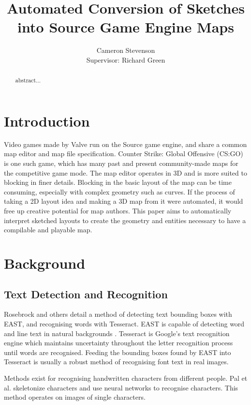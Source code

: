 \documentclass{IEEEtran}
\begin{document}
\title{Automated Conversion of Sketches into Source Game Engine Maps}
\author{Cameron Stevenson\\[0.5cm]{\small Supervisor: Richard Green}}
 
 \maketitle
 
\begin{abstract}
abstract...
\end{abstract}

\section{Introduction}

Video games made by Valve run on the Source game engine, and share a common map editor and map file specification. Counter Strike: Global Offensive (CS:GO) is one such game, which has many past and present community-made maps for the competitive game mode. The map editor operates in 3D and is more suited to blocking in finer details. Blocking in the basic layout of the map can be time consuming, especially with complex geometry such as curves. If the process of taking a 2D layout idea and making a 3D map from it were automated, it would free up creative potential for map authors. This paper aims to automatically interpret sketched layouts to create the geometry and entities necessary to have a compilable and playable map.

\section{Background}
\subsection{Text Detection and Recognition}
Rosebrock \cite{rosebrock2018opencv} and others detail a method of detecting text bounding boxes with EAST, and recognising words with Tesseract. EAST is capable of detecting word and line text in natural backgrounds \cite{zhou2017east}. Tesseract \cite{smith2007overview} is Google's text recognition engine which maintains uncertainty throughout the letter recognition process until words are recognised. Feeding the bounding boxes found by EAST into Tesseract is usually a robust method of recognising font text in real images.

Methods exist for recognising handwritten characters from different people. Pal et al. \cite{pal2010handwritten} skeletonize characters and use neural networks to recognise characters. This method operates on images of single characters.
\end{document}
